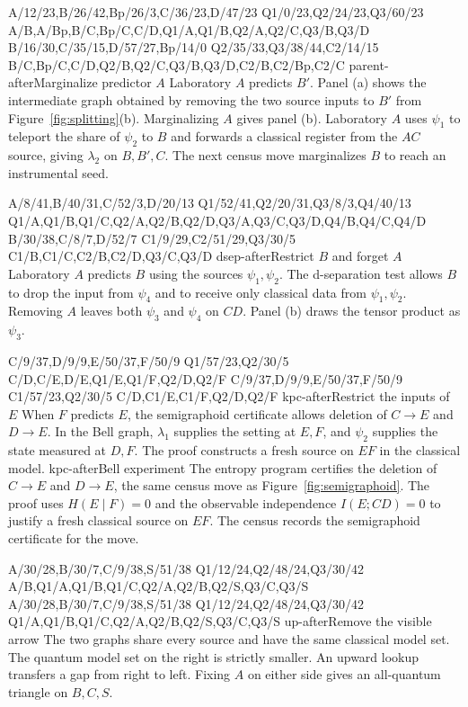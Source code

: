   {A/12/23,B/26/42,Bp/26/3,C/36/23,D/47/23}
  {Q1/0/23,Q2/24/23,Q3/60/23}
  {A/B,A/Bp,B/C,Bp/C,C/D,Q1/A,Q1/B,Q2/A,Q2/C,Q3/B,Q3/D}
  {B/16/30,C/35/15,D/57/27,Bp/14/0}
  {Q2/35/33,Q3/38/44,C2/14/15}
  {B/C,Bp/C,C/D,Q2/B,Q2/C,Q3/B,Q3/D,C2/B,C2/Bp,C2/C}
  {parent-after}{Marginalize predictor \(A\)}
  {Laboratory \(A\) predicts \(B'\). Panel (a) shows the intermediate
   graph obtained by removing the two source inputs to \(B'\) from
   Figure~\ref{fig:splitting}(b). Marginalizing \(A\) gives panel (b).
   Laboratory \(A\) uses \(\psi_1\) to teleport the share of \(\psi_2\) to
   \(B\) and forwards a classical register from the \(AC\) source, giving
   \(\lambda_2\) on \(B,B',C\). The next census move marginalizes \(B\)
   to reach an instrumental seed.}

  {A/8/41,B/40/31,C/52/3,D/20/13}
  {Q1/52/41,Q2/20/31,Q3/8/3,Q4/40/13}
  {Q1/A,Q1/B,Q1/C,Q2/A,Q2/B,Q2/D,Q3/A,Q3/C,Q3/D,Q4/B,Q4/C,Q4/D}
  {B/30/38,C/8/7,D/52/7}
  {C1/9/29,C2/51/29,Q3/30/5}
  {C1/B,C1/C,C2/B,C2/D,Q3/C,Q3/D}
  {dsep-after}{Restrict \(B\) and forget \(A\)}
  {Laboratory \(A\) predicts \(B\) using the sources \(\psi_1,\psi_2\).
   The d-separation test allows \(B\) to drop the input from \(\psi_4\)
   and to receive only classical data from \(\psi_1,\psi_2\). Removing
   \(A\) leaves both \(\psi_3\) and \(\psi_4\) on \(CD\). Panel (b) draws
   the tensor product as \(\psi_3\).}

  {C/9/37,D/9/9,E/50/37,F/50/9}
  {Q1/57/23,Q2/30/5}
  {C/D,C/E,D/E,Q1/E,Q1/F,Q2/D,Q2/F}
  {C/9/37,D/9/9,E/50/37,F/50/9}
  {C1/57/23,Q2/30/5}
  {C/D,C1/E,C1/F,Q2/D,Q2/F}
  {kpc-after}{Restrict the inputs of \(E\)}
  {When \(F\) predicts \(E\), the semigraphoid certificate allows
   deletion of \(C\to E\) and \(D\to E\). In the Bell graph, \(\lambda_1\)
   supplies the setting at \(E,F\), and \(\psi_2\) supplies the state
   measured at \(D,F\). The proof constructs a fresh source on \(EF\)
   in the classical model.}
  {kpc-after}{Bell experiment}
  {The entropy program certifies the deletion of \(C\to E\) and
   \(D\to E\), the same census move as Figure~\ref{fig:semigraphoid}.
   The proof uses \(H(E\mid F)=0\) and the observable independence
   \(I(E;CD)=0\) to justify a fresh classical source on \(EF\). The
   census records the semigraphoid certificate for the move.}

  {A/30/28,B/30/7,C/9/38,S/51/38}
  {Q1/12/24,Q2/48/24,Q3/30/42}
  {A/B,Q1/A,Q1/B,Q1/C,Q2/A,Q2/B,Q2/S,Q3/C,Q3/S}
  {A/30/28,B/30/7,C/9/38,S/51/38}
  {Q1/12/24,Q2/48/24,Q3/30/42}
  {Q1/A,Q1/B,Q1/C,Q2/A,Q2/B,Q2/S,Q3/C,Q3/S}
  {up-after}{Remove the visible arrow}
  {The two graphs share every source and have the same classical model set.
   The quantum model set on the right is strictly smaller. An upward
   lookup transfers a gap from right to left. Fixing \(A\) on either side
   gives an all-quantum triangle on \(B,C,S\).}

